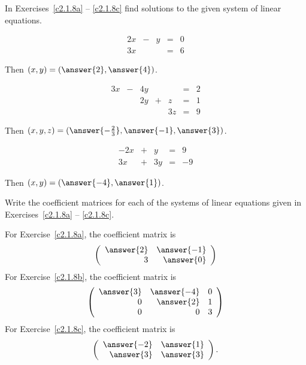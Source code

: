 \documentclass{ximera}
\begin{document}
\noindent In Exercises~\ref{c2.1.8a} -- \ref{c2.1.8c} find solutions
to the given system of linear equations.
\begin{exercise} \label{c2.1.8a}
\[
\begin{array}{rcrcr}
 2x & - & y & = & 0 \\
 3x &   &   & = & 6 \end{array}
\]
\begin{prompt}
  Then $(x,y) = (\answer{2},\answer{4})$.
\end{prompt}
\end{exercise}
\begin{exercise} \label{c2.1.8b}
\[
\begin{array}{rcrcrcr}
 3x & - & 4y &   &    & = & 2\\
    &   & 2y & + & z  & = & 1\\
    &   &    &   & 3z & = & 9 \end{array}
\]
\begin{prompt}
  Then  $(x,y,z) = (\answer{-\frac{2}{3}}, \answer{-1}, \answer{3})$.
\end{prompt}
\end{exercise}
\begin{exercise} \label{c2.1.8c}
\[
\begin{array}{rcrcr}
 -2x & + &  y & = &  9 \\
  3x & + & 3y & = & -9 \end{array}
\]
\begin{prompt}
  Then $(x,y) = (\answer{-4},\answer{1})$.
\end{prompt}
\end{exercise}

\begin{exercise} \label{c2.1.8A}
Write the coefficient matrices for each of the systems of linear equations 
given in Exercises~\ref{c2.1.8a} -- \ref{c2.1.8c}.
\begin{prompt}
  For Exercise~\ref{c2.1.8a}, the coefficient matrix is
  \[
    \mattwo{\answer{2}}{\answer{-1}}{3}{\answer{0}}
  \]
  For Exercise~\ref{c2.1.8b}, the coefficient matrix is
  \[
    \matthree{\answer{3}}{\answer{-4}}{0}{0}{\answer{2}}{1}{0}{0}{3}
  \]
  For Exercise~\ref{c2.1.8c}, the coefficient matrix is
  \[
    \mattwo{\answer{-2}}{\answer{1}}{\answer{3}}{\answer{3}}.
  \]
\end{prompt}

\end{exercise}
\end{document}

